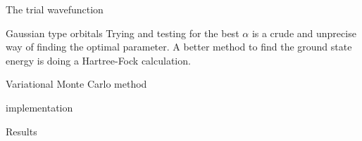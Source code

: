 \documentclass[a4paper, 12pt, titlepage]{article}
\begin{document}
\begin{section}{The trial wavefunction}
 \begin{subsection}{Gaussian type orbitals}
  Trying and testing for the best $\alpha$ is a crude and unprecise way of finding the optimal parameter. A better method to find the ground state energy is doing a Hartree-Fock calculation.  
 \end{subsection}
\end{section}

\begin{section}{Variational Monte Carlo method}
	
\end{section}

\begin{section}{implementation}
	
\end{section}

\begin{section}{Results}
	
\end{section}
\end{document}
